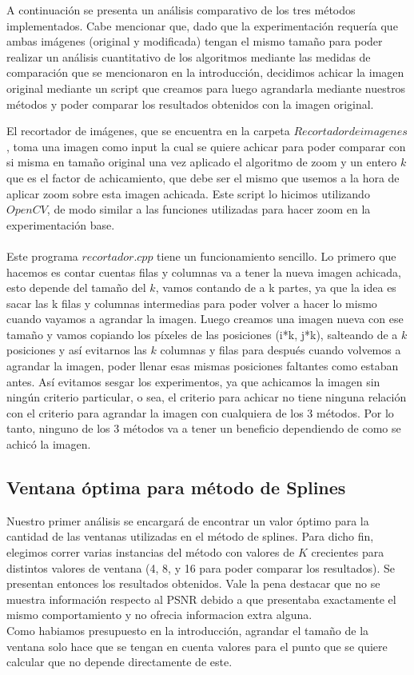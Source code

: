 A continuación se presenta un análisis comparativo de los tres métodos implementados.
Cabe mencionar que, dado que la experimentación requería que ambas imágenes (original y modificada) tengan el mismo tamaño para poder realizar un análisis cuantitativo de los algoritmos mediante las medidas de comparación que se mencionaron en la introducción, decidimos achicar la imagen original mediante un script que creamos para luego agrandarla mediante nuestros métodos y poder comparar los resultados obtenidos con la imagen original.

El recortador de imágenes, que se encuentra en la carpeta $Recortador de imagenes$, toma una imagen como input la cual se quiere achicar para poder comparar con si misma en tamaño original una vez aplicado el algoritmo de zoom y un entero $k$ que es el factor de achicamiento, que debe ser el mismo que usemos a la hora de aplicar zoom sobre esta imagen achicada. Este script lo hicimos utilizando $OpenCV$, de modo similar a las funciones utilizadas para hacer zoom en la experimentación base.
\\ \\
Este programa $recortador.cpp$ tiene un funcionamiento sencillo.
Lo primero que hacemos es contar cuentas filas y columnas va a tener la nueva imagen achicada, esto depende del tamaño del $k$, vamos contando de a k partes, ya que la idea es sacar las k filas y columnas intermedias para poder volver a hacer lo mismo cuando vayamos a agrandar la imagen. Luego creamos una imagen nueva con ese tamaño y vamos copiando los píxeles de las posiciones (i*k, j*k), salteando de a $k$ posiciones y así evitarnos las $k$ columnas y filas para después cuando volvemos a agrandar la imagen, poder llenar esas mismas posiciones faltantes como estaban antes. Así evitamos sesgar los experimentos, ya que achicamos la imagen sin ningún criterio particular, o sea, el criterio para achicar no tiene ninguna relación con el criterio para agrandar la imagen con cualquiera de los 3 métodos. Por lo tanto, ninguno de los 3 métodos va a tener un beneficio dependiendo de como se achicó la imagen.   

\subsection{Ventana óptima para método de Splines}
Nuestro primer análisis se encargará de encontrar un valor óptimo para la cantidad de las ventanas utilizadas en el método de splines.
Para dicho fin, elegimos correr varias instancias del método con valores de $K$ crecientes para distintos valores de ventana (4, 8, y 16 para poder comparar los resultados). Se presentan entonces los resultados obtenidos. Vale la pena destacar que no se muestra información respecto al PSNR debido a que presentaba exactamente el mismo comportamiento y no ofrecia informacion extra alguna.
\\
Como habiamos presupuesto en la introducción, agrandar el tamaño de la ventana solo hace que se tengan en cuenta valores para el punto que se quiere calcular que no depende directamente de este. 

